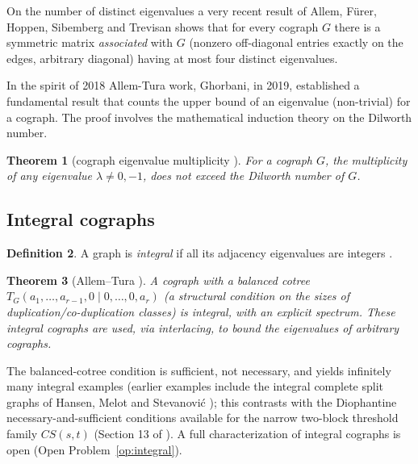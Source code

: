 \documentclass[11pt]{article}
\theoremstyle{plain}
\newtheorem{theorem}{Theorem}[section]
\theoremstyle{definition}
\newtheorem{definition}[theorem]{Definition}
\theoremstyle{remark}
\begin{document}
	On the number of distinct eigenvalues a very recent result of Allem, F\"urer, Hoppen, Sibemberg and Trevisan \cite{AllemEtAl2026} shows that for every cograph $G$ there is a symmetric matrix \emph{associated} with $G$ (nonzero off-diagonal entries exactly on the edges, arbitrary diagonal) having at most four distinct eigenvalues.
	
	
	In the spirit of 2018 Allem-Tura work, Ghorbani, in 2019, established a fundamental result that counts the upper bound of an eigenvalue (non-trivial) for a cograph. The proof involves the mathematical induction theory on the Dilworth number.
	\begin{theorem}[cograph eigenvalue multiplicity \cite{GhorbaniDilworthNumber2019}]
		For a cograph $G$, the multiplicity of any eigenvalue $\lambda\neq0,-1$, does not exceed the Dilworth number of $G$.	
		
	\end{theorem}
	
	
	
	\subsection{Integral cographs}
	\label{sec:integral-general}
	
	\begin{definition}
		A graph is \emph{integral} if all its adjacency eigenvalues are integers \cite{HararySchwenk1974}.
	\end{definition}
	
	\begin{theorem}[Allem--Tura \cite{AllemTura2020}]
		\label{thm:integral-cograph}
		A cograph with a \emph{balanced} cotree $T_G(a_1,\ldots,a_{r-1},0\mid 0,\ldots,0,a_r)$ (a structural condition on the sizes of duplication/co-duplication classes) is integral, with an explicit spectrum. These integral cographs are used, via interlacing, to bound the eigenvalues of arbitrary cographs.
	\end{theorem}
	
	The balanced-cotree condition is sufficient, not necessary, and yields infinitely many integral examples (earlier examples include the integral complete split graphs of Hansen, Melot and Stevanovi\'c \cite{HansenMelotStevanovic2002}); this contrasts with the Diophantine necessary-and-sufficient conditions available for the narrow two-block threshold family $CS(s,t)$ (Section 13 of \cite{MannaMandal2026}). A full characterization of integral cographs is open (Open Problem~\ref{op:integral}).
	
\end{document}
